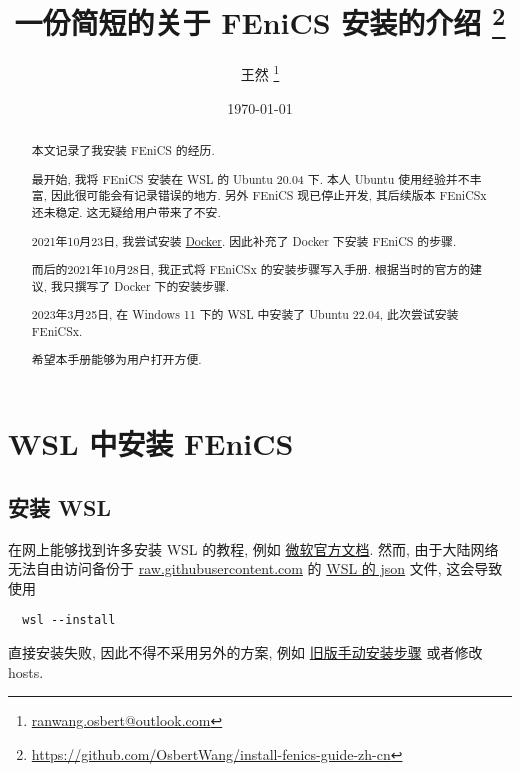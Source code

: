 \documentclass[fontset=founder]{ctexrep}
\title{\bfseries 一份简短的关于 FEniCS 安装的介绍%
  \thanks{\url{https://github.com/OsbertWang/install-fenics-guide-zh-cn}}%
}
\author{王然%
  \thanks{\href{mailto:ranwang.osbert@outlook.com}%
    {\ttfamily ranwang.osbert@outlook.com}}%
}
\date{\today}
\begin{document}
  
\maketitle

\begin{abstract}
  
  本文记录了我安装 FEniCS 的经历.
  
  最开始,
  我将 FEniCS 安装在 WSL 的 Ubuntu 20.04 下.
  本人 Ubuntu 使用经验并不丰富,
  因此很可能会有记录错误的地方.
  另外 FEniCS 现已停止开发,
  其后续版本 FEniCSx 还未稳定.
  这无疑给用户带来了不安.
  
  2021年10月23日,
  我尝试安装 \href{https://www.docker.com/get-started}{Docker}.
  因此补充了 Docker 下安装 FEniCS 的步骤.
  
  而后的2021年10月28日,
  我正式将 FEniCSx 的安装步骤写入手册.
  根据当时的官方的建议,
  我只撰写了 Docker 下的安装步骤.

  2023年3月25日,
  在 Windows 11 下的 WSL 中安装了 Ubuntu 22.04,
  此次尝试安装 FEniCSx.
  
  希望本手册能够为用户打开方便.
\end{abstract}

\tableofcontents

\chapter{WSL 中安装 FEniCS}

\section{安装 WSL}\label{sec:wsl.install}

在网上能够找到许多安装 WSL 的教程,
例如%
\href{https://learn.microsoft.com/zh-cn/windows/wsl/install}{微软官方文档}.
然而,
由于大陆网络无法自由访问备份于 \url{raw.githubusercontent.com} 的
\href{https://raw.githubusercontent.com/microsoft/WSL/master/distributions/DistributionInfo.json}{WSL 的 json} 文件,
这会导致使用
\begin{lstlisting}
  wsl --install
\end{lstlisting}
直接安装失败,
因此不得不采用另外的方案,
例如%
\href{https://learn.microsoft.com/zh-cn/windows/wsl/install-manual}{旧版手动安装步骤}%
或者修改 hosts.
\end{document}
